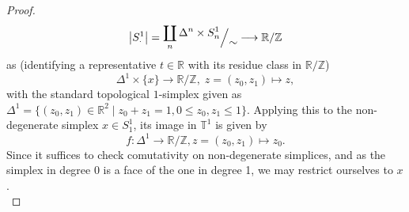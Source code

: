 \documentclass[10pt, a4paper, UKenglish]{article}
\numberwithin{equation}{section}
\newcommand{\bR}{\mathbb{R}}
\newcommand{\bZ}{\mathbb{Z}}
\newcommand{\sT}{\mathbb{T}}		%
\def\empty{}
\newcommand{\defas}{\coloneqq}  %
\newcommand{\abs}[1]{\left\vert#1\right\vert}	%
\newcommand{\with}{\mid}  %
\renewcommand{\hom}{\operatorname{hom}}
\newcommand{\comm}[1]{\colorbox{yellow}{#1}}
\theoremstyle{plain}
\theoremstyle{definition}
\renewcommand{\to}{\longrightarrow}
\renewcommand{\mapsto}{\longmapsto}
\newcommand\quotient[2]{
	\mathchoice
		{%
			\text{\raise1ex\hbox{$#1$}\Big/\lower1ex\hbox{$#2$}}%
		}
		{%
			#1\,/\,#2
		}
		{%
			#1\,/\,#2
		}
		{%
			#1\,/\,#2
		}
}
\newcommand*{\myrightarrow}[2][]{%
  \def\temp{#1}%
  \ifx\temp\empty
   \def\mycmd{\xrightarrow}%
  \else
   \def\mycmd{\xrightarrow[{\mathmakebox[\trollo]{#1}}]}%
  \fi
  \mycmd{\mathmakebox[\trollo]{#2}}%
 }
\newlength{\trollo}
\begin{document}
\begin{proof}
	\[	\abs{S^1_\cdot} = \quotient{\coprod\limits_{n} \Delta^n \times S^1_n}{\sim} \to \bR/\bZ		\]
	as (identifying a representative $t \in \bR$ with its residue class in $\bR/\bZ$)
	\[	\Delta^1 \times \{x\} \to \bR/\bZ,\;z = (z_0,z_1) \mapsto z, \]
with the standard topological $1$-simplex given as $\Delta^1 = \{(z_0,z_1) \in \bR^2 \with z_0+z_1=1, 0 \leq z_0,z_1 \leq 1\}$. Applying this to the non-degenerate simplex $x \in S^1_1$, its image in $\sT^1$ is given by
\[
	f:\Delta^1 \to \bR/\bZ, z = (z_0,z_1) \mapsto z_0.
\]
Since it suffices to check comutativity on non-degenerate simplices, and as the simplex in degree 0 is a face of the one in degree 1, we may restrict ourselves to $x$.\\
%
%

\end{proof}
\end{document}
